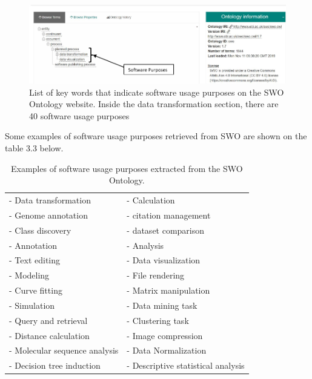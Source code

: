 \begin{figure}[htbp]
	\centering
	\includegraphics[width=1\textwidth]{4.graphics/figures/ch_3/SWO2}
	\caption{List of key words that indicate software usage purposes on the SWO Ontology website. Inside the data transformation section, there are 40 software usage purposes}
	\label{fig:chapter03:setup}
\end{figure}

Some examples of software usage purposes retrieved from SWO are shown on the table 3.3 below.

\begin{table}[h!]
	\begin{center}
		\caption{Examples of software usage purposes extracted from the SWO Ontology.}
		\label{tab:table1}
		\begin{tabular}{|l|l|} %
			
			\hline
			- Data transformation & - Calculation  \\
			- Genome annotation   & - citation management  \\
			- Class discovery     & - dataset comparison   \\
			- Annotation          & - Analysis \\
			- Text editing        & - Data visualization  \\
			- Modeling           & - File rendering   \\
			- Curve fitting       & - Matrix manipulation  \\
			- Simulation          & - Data mining task   \\
			- Query and retrieval & - Clustering task \\
			- Distance calculation & - Image compression \\
			- Molecular sequence analysis & - Data Normalization \\
			- Decision tree induction & - Descriptive statistical analysis \\
			
			\hline
		\end{tabular}
	\end{center}
\end{table}


